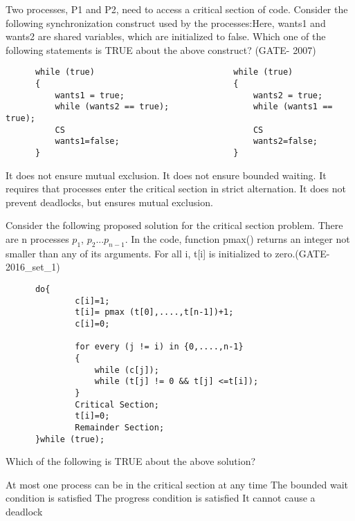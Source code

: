 \begin{questyle}

  \question  Two processes, P1 and P2, need to access a critical section of code. Consider the following synchronization construct used by the processes:Here, wants1 and wants2 are shared variables, which are initialized to false. Which one of the following statements is TRUE about the above construct? (GATE- 2007)

  \begin{lstlisting}
      while (true)                            while (true)
      {                                       {
          wants1 = true;                          wants2 = true;
          while (wants2 == true);                 while (wants1 == true);
          CS                                      CS
          wants1=false;                           wants2=false;
      }                                       }
  \end{lstlisting}

  \begin{choices}
    \choice  It does not ensure mutual exclusion.
    \choice  It does not ensure bounded waiting.
    \choice  It requires that processes enter the critical section in strict alternation.
    \CorrectChoice  It does not prevent deadlocks, but ensures mutual exclusion.
  \end{choices}

  \end{questyle}




\begin{questyle}

  \question  Consider the following proposed solution for the critical section problem.
  There are n processes \(p_1\), \(p_2\)...\(p_{n-1}\). In the code, function pmax() returns an integer not smaller than any of its arguments.
  For all i, t[i] is initialized to zero.(GATE- 2016\_set\_1)

  \begin{lstlisting}
      do{
              c[i]=1;
              t[i]= pmax (t[0],....,t[n-1])+1;
              c[i]=0;

              for every (j != i) in {0,....,n-1}
              {
                  while (c[j]);
                  while (t[j] != 0 && t[j] <=t[i]);
              }
              Critical Section;
              t[i]=0;
              Remainder Section;
      }while (true);

  \end{lstlisting}
  Which of the following is TRUE about the above solution?

  \begin{choices}
    \CorrectChoice  At most one process can be in the critical section at any time
    \choice  The bounded wait condition is satisfied
    \choice  The progress condition is satisfied
    \choice  It cannot cause a deadlock
  \end{choices}

  \end{questyle}



